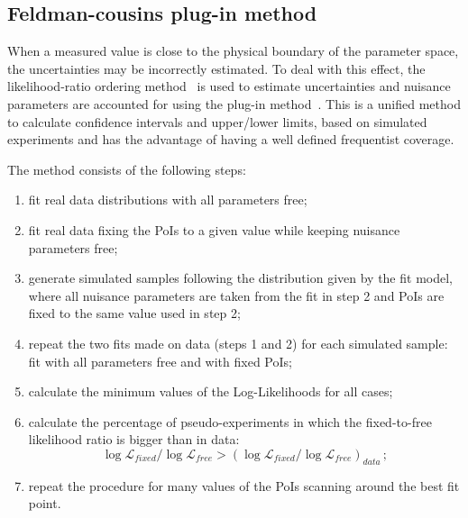 \subsection{Feldman-cousins plug-in method}
\label{sec:FeldmanCousins}

When a measured value is close to the physical boundary of the parameter space, the uncertainties may be 
incorrectly estimated. To deal with this effect, the likelihood-ratio ordering method~\cite{Feldman:1997qc} is used to 
estimate uncertainties and nuisance parameters are accounted for using the plug-in method~\cite{Karbach:2011uz}. 
This is a unified method to calculate confidence intervals and upper/lower limits, based on simulated experiments 
and has the advantage of having a well defined frequentist coverage.


The method consists of the following steps:
\begin{enumerate}
\item fit real data distributions with all parameters free;
\item fit real data fixing the PoIs to a given value while keeping nuisance parameters free;
\item generate simulated samples following the distribution given by the fit model,
where all nuisance parameters are taken from the fit in step 2 and PoIs are fixed to the same value used in step 2;
\item repeat the two fits made on data (steps 1 and 2) for each simulated sample: fit with all parameters free and with fixed PoIs;
\item calculate the minimum values of the Log-Likelihoods for all cases;
\item calculate the percentage of pseudo-experiments in which the fixed-to-free likelihood ratio
is bigger than in data: 
$$\log\mathcal{L}_{fixed}/\log\mathcal{L}_{free} > (\log\mathcal{L}_{fixed}/\log\mathcal{L}_{free})_{data}\,;$$
\item repeat the procedure for many values of the PoIs scanning around the best fit point.
\end{enumerate}

